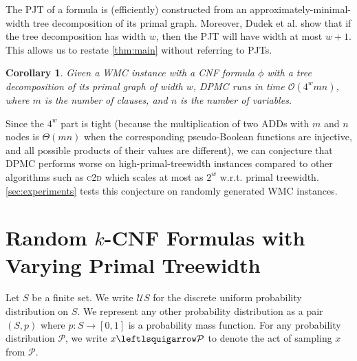 \documentclass{article}
\newtheorem{corollary}{Corollary}
\theoremstyle{definition}
\theoremstyle{remark}
\begin{document}
The PJT of a formula is (efficiently) constructed from an
approximately-minimal-width tree decomposition of its primal graph. Moreover,
Dudek et al. \cite{DBLP:conf/cp/DudekPV20} show that if the tree decomposition
has width $w$, then the PJT will have width at most $w+1$. This allows us to
restate \cref{thm:main} without referring to PJTs.

\begin{corollary}
  Given a \textsf{WMC} instance with a CNF formula $\phi$ with a tree
  decomposition of its primal graph of width $w$, \textsc{DPMC}
  \cite{DBLP:conf/cp/DudekPV20} runs in time $\mathcal{O}(4^wmn)$, where $m$ is
  the number of clauses, and $n$ is the number of variables.
\end{corollary}

Since the $4^w$ part is tight (because the multiplication of two ADDs with $m$
and $n$ nodes is $\Theta(mn)$ when the corresponding pseudo-Boolean functions
are injective, and all possible products of their values are different), we can
conjecture that \textsc{DPMC} \cite{DBLP:conf/cp/DudekPV20} performs worse
on high-primal-treewidth instances compared to other algorithms such as
\textsc{c2d} \cite{DBLP:conf/ecai/Darwiche04} which scales at most as $2^w$
w.r.t. primal treewidth. \cref{sec:experiments} tests this conjecture on
randomly generated \textsf{WMC} instances.

\section{Random $k$-CNF Formulas with Varying Primal Treewidth}


Let $S$ be a finite set. We write $\mathcal{U}S$ for the discrete uniform
probability distribution on $S$. We represent any other probability distribution
as a pair $(S, p)$ where $p\colon S \to [0, 1]$ is a probability mass function.
For any probability distribution $\mathcal{P}$, we write $x \leftlsquigarrow
\mathcal{P}$ to denote the act of sampling $x$ from $\mathcal{P}$.
\end{document}
